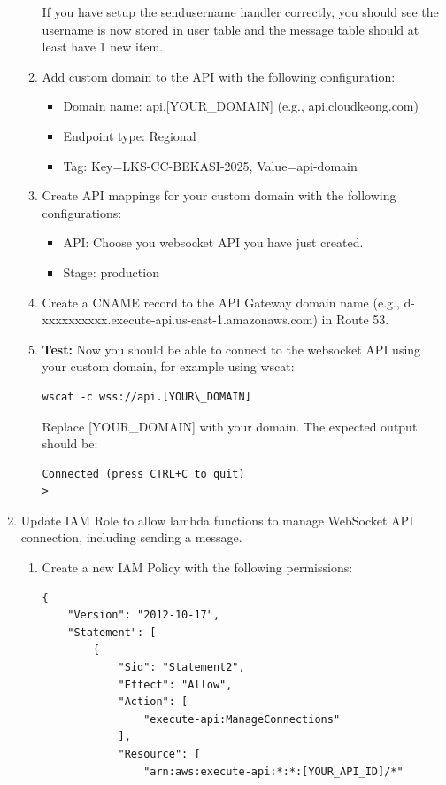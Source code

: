 \documentclass{article}
\begin{document}
\begin{enumerate}
\begin{enumerate}
      If you have setup the sendusername handler correctly, you should see the username is now stored in user table and the message table should at least have 1 new item.
      \item Add custom domain to the API with the following configuration:
      \begin{itemize}
        \item Domain name: api.[YOUR\_DOMAIN] (e.g., api.cloudkeong.com)
        \item Endpoint type: Regional
        \item Tag: Key=LKS-CC-BEKASI-2025, Value=api-domain
      \end{itemize}
      \item Create API mappings for your custom domain with the following configurations:
      \begin{itemize}
        \item API: Choose you websocket API you have just created.
        \item Stage: production
      \end{itemize}
      \item Create a CNAME record to the API Gateway domain name (e.g., d-xxxxxxxxxx.execute-api.us-east-1.amazonaws.com) in Route 53.
      \item {\color{red}\textbf{Test:}} Now you should be able to connect to the websocket API using your custom domain, for example using wscat:
      \begin{verbatim}
wscat -c wss://api.[YOUR\_DOMAIN]
      \end{verbatim}
      Replace [YOUR\_DOMAIN] with your domain. The expected output should be:
      \begin{verbatim}
Connected (press CTRL+C to quit)
>
      \end{verbatim}
    \end{enumerate}
  \item Update IAM Role to allow lambda functions to manage WebSocket API connection, including sending a message.
    \begin{enumerate}
      \item Create a new IAM Policy with the following permissions:
    \begin{verbatim}
{
    "Version": "2012-10-17",
    "Statement": [
        {
            "Sid": "Statement2",
            "Effect": "Allow",
            "Action": [
                "execute-api:ManageConnections"
            ],
            "Resource": [
                "arn:aws:execute-api:*:*:[YOUR_API_ID]/*"

\end{verbatim}
\end{enumerate}
\end{enumerate}
\end{document}
